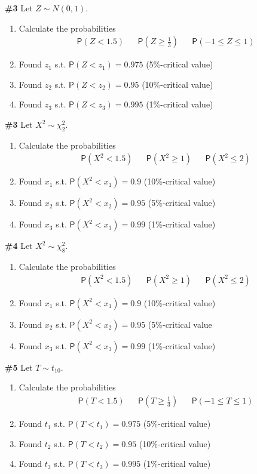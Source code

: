 \documentclass[12pt]{article}
\begin{document}
\noindent\textbf{\#3} Let \(Z\sim N(0,1)\). 
\begin{enumerate}
	\item Calculate the probabilities
	\begin{align*}
	&\mathsf{P}(Z<1.5) & &\mathsf{P}(Z\geq\frac13) & &\mathsf{P}(-1\leq Z\leq 1)
	\end{align*}
	\item Found $z_1$ s.t. \(\mathsf{P}(Z<z_1)=0.975\) (5\%-critical value)
	\item Found $z_2$ s.t. \(\mathsf{P}(Z<z_2)=0.95\) (10\%-critical value)
	\item Found $z_3$ s.t. \(\mathsf{P}(Z<z_3)=0.995\) (1\%-critical value)
\end{enumerate}

\noindent\textbf{\#3} Let \(X^2\sim\chi^2_2\). 
\begin{enumerate}
	\item Calculate the probabilities
	\begin{align*}
	&\mathsf{P}(X^2<1.5) & &\mathsf{P}(X^2\geq 1) & &\mathsf{P}( X^2\leq 2)
	\end{align*}
	\item Found $x_1$ s.t. \(\mathsf{P}(X^2<x_1)=0.9\) (10\%-critical value)
	\item Found $x_2$ s.t. \(\mathsf{P}(X^2<x_2)=0.95\) (5\%-critical value)
	\item Found $x_3$ s.t. \(\mathsf{P}(X^2<x_3)=0.99\) (1\%-critical value)
\end{enumerate}

\noindent\textbf{\#4} Let \(X^2\sim\chi^2_8\). 
\begin{enumerate}
	\item Calculate the probabilities
	\begin{align*}
	&\mathsf{P}(X^2<1.5) & &\mathsf{P}(X^2\geq 1) & &\mathsf{P}( X^2\leq 2)
	\end{align*}
	\item Found $x_1$ s.t. \(\mathsf{P}(X^2<x_1)=0.9\) (10\%-critical value)
	\item Found $x_2$ s.t. \(\mathsf{P}(X^2<x_2)=0.95\) (5\%-critical value
	\item Found $x_3$ s.t. \(\mathsf{P}(X^2<x_3)=0.99\) (1\%-critical value)
\end{enumerate}

\noindent\textbf{\#5} Let \(T\sim t_{10}\). 
\begin{enumerate}
	\item Calculate the probabilities
	\begin{align*}
	&\mathsf{P}(T<1.5) & &\mathsf{P}(T\geq\frac13) & &\mathsf{P}(-1\leq T\leq 1)
	\end{align*}
	\item Found $t_1$ s.t. \(\mathsf{P}(T<t_1)=0.975\) (5\%-critical value)
	\item Found $t_2$ s.t. \(\mathsf{P}(T<t_2)=0.95\) (10\%-critical value)
	\item Found $t_3$ s.t. \(\mathsf{P}(T<t_3)=0.995\) (1\%-critical value)
\end{enumerate}
\end{document}
